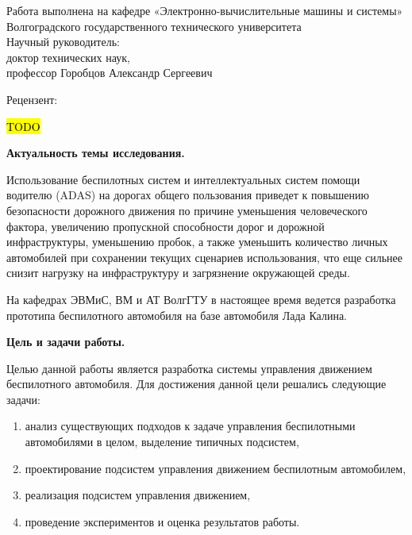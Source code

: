 \begin{nospasing}
\noindent
Работа выполнена на кафедре «Электронно-вычислительные машины и
системы» Волгоградского государственного технического университета\\

\noindent
Научный руководитель:\\

    \setlength{\leftskip}{3cm}
    \noindent
    доктор технических наук, \\
    профессор Горобцов Александр Сергеевич \\	
    
    \setlength{\leftskip}{0pt}

\noindent
Рецензент:

    \setlength{\leftskip}{3cm}
    \noindent
    \hl{TODO} \\	
    
    \setlength{\leftskip}{0pt}

\end{nospasing}

\newpage


\textbf{Актуальность темы исследования.}

Использование беспилотных систем и интеллектуальных систем помощи водителю (ADAS) на дорогах общего
пользования приведет к повышению безопасности дорожного движения по причине уменьшения человеческого
фактора, увеличению пропускной способности дорог и дорожной инфраструктуры, уменьшению пробок, а также
уменьшить количество личных автомобилей при сохранении текущих сценариев использования, что еще
сильнее снизит нагрузку на инфраструктуру и загрязнение окружающей среды. 

На кафедрах ЭВМиС, ВМ и АТ ВолгГТУ в настоящее время ведется разработка прототипа беспилотного
автомобиля на базе автомобиля Лада Калина. 

\textbf{Цель и задачи работы.}

Целью данной работы является разработка системы управления движением беспилотного автомобиля.
Для достижения данной цели решались следующие задачи:
\begin{enumerate}
    \item анализ существующих подходов к задаче управления беспилотными автомобилями в целом, выделение 
    типичных подсистем,
    \item проектирование подсистем управления движением беспилотным автомобилем,
    \item реализация подсистем управления движением,
    \item проведение экспериментов и оценка результатов работы. 
\end{enumerate}

